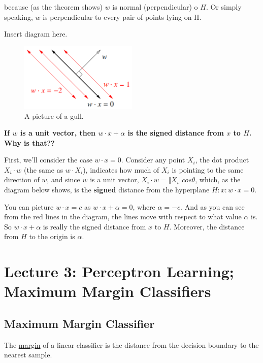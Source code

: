 \documentclass{report}
\begin{document}
because (as the theorem shows) $w$ is normal (perpendicular) o $H$. Or simply speaking, $w$ is perpendicular to every pair of points lying on H.\newline

Insert diagram here.\newline
\begin{figure}[h!]
  \centering
  \includegraphics[width=0.5\textwidth]{CS189_Lec_02/lecture_2_signed_distance.png}
  \caption{A picture of a gull.}
\end{figure}


\textbf{If $w$ is a unit vector, then $w \cdot x + \alpha$ is the signed distance from $x$ to $H$. Why is that??}

First, we'll consider the case $w \cdot x = 0$. Consider any point $X_i$, the dot product $X_i \cdot w$ (the same as $w \cdot X_i$), indicates how much of $X_i$ is pointing to the same direction of $w$, and since $w$ is a unit vector, $X_i \cdot w = \Vert X_i \Vert cos \theta$, which, as the diagram below shows, is the \textbf{signed} distance from the hyperplane $H: {x: w \cdot x = 0}$.\newline

You can picture $w \cdot x = c$ as $w \cdot x + \alpha = 0$, where $\alpha = -c$. And as you can see from the red lines in the diagram, the lines move with respect to what value $\alpha$ is. So $w \cdot x + \alpha$ is really the signed distance from $x$ to $H$. Moreover, the distance from $H$ to the origin is $\alpha$.















\chapter{Lecture 3: Perceptron Learning; Maximum Margin Classifiers}
\section{Maximum Margin Classifier}
The \underline{margin} of a linear classifier is the distance from the decision boundary to the nearest sample. \newline\newline
\end{document}
